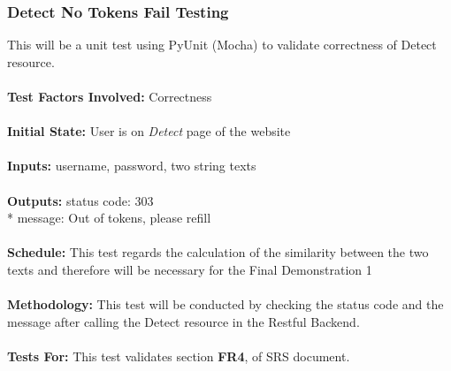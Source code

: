 \documentclass[12pt, titlepage]{article}
\begin{document}
\subsubsection{{Detect No Tokens Fail Testing}}
This will be a unit test using PyUnit (Mocha) to validate correctness of Detect resource. \\
\\
\textbf{Test Factors Involved:} Correctness \\
\\
\textbf{Initial State: } User is on \textit{Detect} page of the website \\
\\
\textbf{Inputs: } username, password, two string texts \\
\\
\textbf{Outputs:} status code: 303 \\*
                  message: Out of tokens, please refill \\
\\
\textbf{Schedule:} This test regards the calculation of the similarity between the two texts and therefore will be necessary for the Final Demonstration 1 \\
\\
\textbf{Methodology: } This test will be conducted by checking the status code and the message after calling the Detect resource in the Restful Backend. \\
\\
\textbf{Tests For:} This test validates section \textbf{FR4}, of SRS document.

\end{document}
